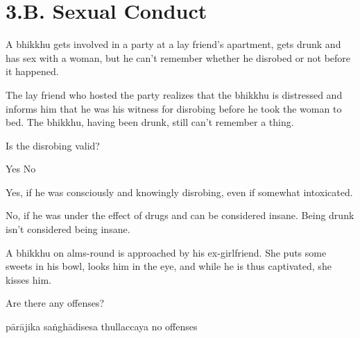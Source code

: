 \chapter{3.B. Sexual Conduct}
\renewcommand*{\theChapterTitle}{3.B. Sexual Conduct}

\begin{exam}{\autoExamName}

\begin{problem}

  A bhikkhu gets involved in a party at a lay friend's apartment, gets drunk and has sex with a woman,
  but he can't remember whether he disrobed or not before it happened.

  \bigskip

  The lay friend who hosted the party realizes that the bhikkhu is distressed
  and informs him that he was his witness for disrobing
  before he took the woman to bed.
  The bhikkhu, having been drunk, still can't remember a thing.

  \bigskip

  Is the disrobing valid?

  \bigskip

  \begin{answers}{2}
    \bChoices
     Yes\eAns
     No\eAns
    \eChoices
  \end{answers}

  \begin{solution}
    Yes, if he was consciously and knowingly disrobing, even if somewhat intoxicated.

    No, if he was under the effect of drugs and can be considered insane. Being drunk isn't considered being insane.
  \end{solution}

\end{problem}

\problemDivide

\begin{problem}

  A bhikkhu on alms-round is approached by his ex-girlfriend. She puts some sweets in his bowl, looks him in the eye, and while he is thus captivated, she kisses him.

  Are there any offenses?

  \bigskip

  \begin{answers}{4}
    \bChoices
     pārājika\eAns
     saṅghādisesa\eAns
     thullaccaya\eAns
     no offenses\eAns
    \eChoices
  \end{answers}


\end{problem}
\end{exam}
